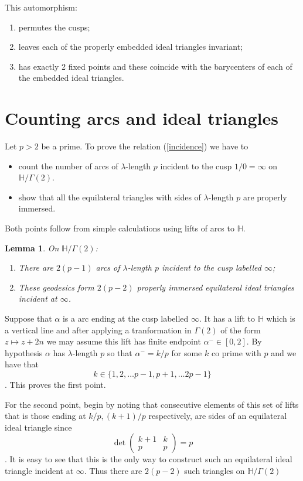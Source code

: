 \documentclass[12pt]{amsart}
\theoremstyle{plain}
\newtheorem{lemma}{Lemma}[section]
\theoremstyle{definition}
\def\HH{\mathbb{H}}
\def\xx{\HH/g2}
\def\g2{\Gamma(2)}
\def\xx{\HH/\g2}
\begin{document}
This automorphism:
\begin{enumerate}
\item permutes the cusps;
\item leaves each of the properly embedded  ideal triangles invariant;
\item has exactly 2 fixed points and these coincide with the
	barycenters of each of the embedded ideal triangles.
\end{enumerate}




\section{Counting arcs and ideal triangles}
\label{counting arcs etc}

Let $p> 2$ be a prime. To prove the relation (\ref{incidence})
we have to  
\begin{itemize}
\item count the number 
of arcs of $\lambda$-length $p$
incident to the cusp $1/0 = \infty$ on $\xx$.
\item 
show that all the equilateral triangles with sides of $\lambda$-length $p$ are properly immersed.
\end{itemize}

Both points follow from simple calculations using lifts of
arcs to $\HH$.


\begin{lemma}\label{counting}
On $\xx$:
\begin{enumerate}
\item There are $2(p-1)$ arcs of $\lambda$-length $p$ incident to the cusp labelled  $\infty$;
\item These geodesics form $2(p-2)$ properly  immersed equilateral ideal triangles incident at $\infty$.
\end{enumerate}
\end{lemma}

\proof Suppose that $\alpha$ is a arc ending at the cusp labelled 
$\infty$.
It has a lift to $\HH$ which is a vertical line and after 
applying a tranformation in $\Gamma(2)$ of the 
form $z \mapsto z + 2n$ we may assume this lift has finite endpoint $\alpha^- \in [0,2]$.
By hypothesis $\alpha$ has  $\lambda$-length $p$ 
so that $\alpha^- = k/p$ for some $k$ co prime with $p$
and we have that
$$ k \in \{1,2,\ldots p-1, p+ 1, \ldots 2p -1 \}$$.
This proves the first point.

For the second point, begin by  noting that consecutive elements of this set of lifts
that is those ending at $k/p, (k+1)/p$ respectively, are sides of
an equilateral ideal triangle since
$$\det \begin{pmatrix}
k + 1 & k \\ p & p 
\end{pmatrix} = p$$.
It is easy to see that this is the only way to construct such
an  equilateral ideal triangle incident at $\infty$.
Thus there are $2(p-2)$ such triangles on $\xx$
\end{document}
